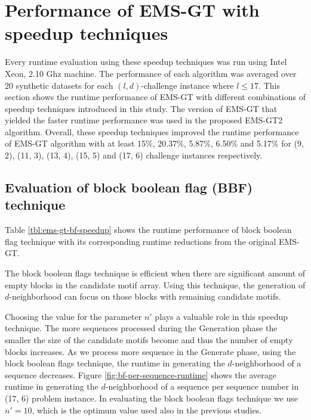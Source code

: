 \section{Performance of EMS-GT with speedup techniques}
Every runtime evaluation using these speedup techniques was run using Intel Xeon, 2.10 Ghz machine. The performance of each algorithm was averaged over 20 synthetic datasets for each $(l, d)$-challenge instance where $l \leq 17$. This section shows the runtime performance of EMS-GT with different combinations of speedup techniques introduced in this study. The version of EMS-GT that yielded the faster runtime performance was used in the proposed EMS-GT2 algorithm. Overall, these speedup techniques improved the runtime performance of EMS-GT algorithm with at least 15\%, 20.37\%, 5.87\%, 6.50\% and 5.17\% for (9, 2), (11, 3), (13, 4), (15, 5) and (17, 6) challenge instances respectively. 



	\subsection{Evaluation of block boolean flag (BBF) technique}
	Table \ref{tbl:ems-gt-bf-speedup} shows the runtime performance of block boolean flag technique with its corresponding runtime reductions from the original EMS-GT.

	

	The block boolean flags technique is efficient when there are significant amount of empty blocks in the candidate motif array. Using this technique, the generation of $d$-neighborhood can focus on those blocks with remaining candidate motifs. 

	Choosing the value for the parameter $n'$ plays a valuable role in this speedup technique. The more sequences processed during the Generation phase the smaller the size of the candidate motifs become and thus the number of empty blocks increases. As we process more sequence in the Generate phase, using the block boolean flags technique, the runtime in generating the $d$-neighborhood of a sequence decreases. Figure \ref{fig:bf-per-sequence-runtime} shows the average runtime in generating the $d$-neighborhood of a sequence per sequence number in (17, 6) problem instance. In evaluating the block boolean flags technique we use $n'=10$, which is the optimum value used also in the previous studies.

